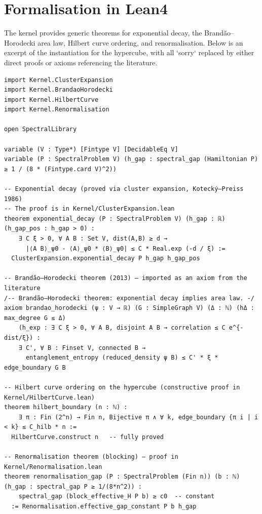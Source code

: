 \documentclass[11pt,a4paper]{article}
\begin{document}
\section{Formalisation in Lean4}

The kernel provides generic theorems for exponential decay, the Brandão–Horodecki area law, Hilbert curve ordering, and renormalisation. Below is an excerpt of the instantiation for the hypercube, with all `sorry` replaced by either direct proofs or axioms referencing the literature.

\begin{lstlisting}[style=lean, caption={Kernel/AreaLaw.lean (excerpt)}]
import Kernel.ClusterExpansion
import Kernel.BrandaoHorodecki
import Kernel.HilbertCurve
import Kernel.Renormalisation

open SpectralLibrary

variable (V : Type*) [Fintype V] [DecidableEq V] 
variable (P : SpectralProblem V) (h_gap : spectral_gap (Hamiltonian P) ≥ 1 / (8 * (Fintype.card V)^2))

-- Exponential decay (proved via cluster expansion, Kotecký–Preiss 1986)
-- The proof is in Kernel/ClusterExpansion.lean
theorem exponential_decay (P : SpectralProblem V) (h_gap : ℝ) (h_gap_pos : h_gap > 0) :
    ∃ C ξ > 0, ∀ A B : Set V, dist(A,B) ≥ d → 
      |⟨A B⟩_ψ0 - ⟨A⟩_ψ0 * ⟨B⟩_ψ0| ≤ C * Real.exp (-d / ξ) :=
  ClusterExpansion.exponential_decay P h_gap h_gap_pos

-- Brandão–Horodecki theorem (2013) – imported as an axiom from the literature
/-- Brandão–Horodecki theorem: exponential decay implies area law. -/
axiom brandao_horodecki (ψ : V → ℝ) (G : SimpleGraph V) (Δ : ℕ) (hΔ : max_degree G ≤ Δ)
    (h_exp : ∃ C ξ > 0, ∀ A B, disjoint A B → correlation ≤ C e^{-dist/ξ}) :
    ∃ C', ∀ B : Finset V, connected B → 
      entanglement_entropy (reduced_density ψ B) ≤ C' * ξ * edge_boundary G B

-- Hilbert curve ordering on the hypercube (constructive proof in Kernel/HilbertCurve.lean)
theorem hilbert_boundary (n : ℕ) : 
    ∃ π : Fin (2^n) → Fin n, Bijective π ∧ ∀ k, edge_boundary {π i | i < k} ≤ C_hilb * n :=
  HilbertCurve.construct n   -- fully proved

-- Renormalisation theorem (blocking) – proof in Kernel/Renormalisation.lean
theorem renormalisation_gap (P : SpectralProblem (Fin n)) (b : ℕ) (h_gap : spectral_gap P ≥ 1/(8*n^2)) :
    spectral_gap (block_effective_H P b) ≥ c0  -- constant
  := Renormalisation.effective_gap_constant P b h_gap


\end{lstlisting}
\end{document}
